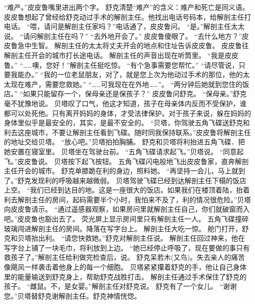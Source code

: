 \documentclass[a4paper,12pt,UTF8,twoside]{ctexbook}
\begin{document}
        “难产。”皮皮鲁嘴里进出两个字。 
        舒克清楚“难产”的含义：难产和死亡是同义语。 
        皮皮鲁想起了曾经给舒克动过手术的解剖主任。他找出电话号码本，给解剖主任打电话。 
        “喂，请问是解剖主任家吗？”电话通了，皮皮鲁问。 
        “是。”解剖主任太太说。 
        “请问解剖主任在吗？” 
        “去外地开会了。” 
        皮皮鲁傻眼了。 
        “去什么地方？”皮皮鲁急中生智。 
        解剖主任的太太将丈夫开会的地点和住址告诉皮皮鲁。 
        皮皮鲁往解剖主任开会的城市打长途电话。 
        解剖主任的声音出现在听筒里。 
        “我是皮皮鲁。” 
        “……噢，您好！”解剖主任挺吃惊。 
        “有个急事需要您帮忙。” 
        “请尽管说，只要我能办。” 
        “我的一位老鼠朋友，对了，就是您上次为他动过手术的那位，他的太太现在难产，需要您救她。” 
        “……可我现在在外地……”。 
        “两分钟后她就到您住的饭店。” 
        “如果只能留存一个，保母亲还是保孩子？” 
        皮皮鲁问舒克。 
        “保母亲。”舒克毫不犹豫地说。 
        贝塔叹了口气，他这才知道，孩子在母亲体内反而不受保护，谁都可以处死他。只有离开妈妈的身体，才受法律保护。对于孩子来说，躲在妈妈的身体里似乎是最安全的，其实，是最不安全的。 
        “贝塔，你驾驶五角飞碟送舒克和利去这座城市，不要让解剖主任看到飞碟。随时同我保持联系。”皮皮鲁将解剖主任的地址交给贝塔。 
        “放心吧。”贝塔拍拍胸脯。 
        舒克和贝塔将利抬进五角飞碟．把她安置在寝室里。 
        贝塔坐在驾驶台前。 
        “五角飞碟请求起飞。”贝塔说。 
        “同意起飞。”皮皮鲁说。 
        贝塔按下起飞按钮。 
        五角飞碟闪电般地飞出皮皮鲁家，直奔解剖主任开会的城市。 
        舒克单膝跪在利的身边，照料她。 
        “再坚持一会儿，马上就到了。”舒克发现利的呼吸越来越微弱。 
        贝塔驾驶飞碟已经到达解剖主任下榻的饭店上空。 
        “我们已经到达目的地。这是一座很大的饭店。如果我们在楼顶着陆，抬着利去解剖主任的房间，起码需要半个小时，我怕来不及了，利的情况很危险。”贝塔向皮皮鲁请示。 
        “通过遥感器观察，如果房问里就解剖主任自己，你们就破窗而入吧。”皮皮鲁也豁出去了。 
        荧光屏上显示房间里只有解剖主任一人。 
        五角飞碟撞碎玻璃闯进解剖主任的房间。降落在写字台上。 
        解剖主任大吃一惊。 
        舱门打开，舒克和贝塔抬出利。 
        “请您快救她。”舒克对解剖主任说。 
        解剖主任回过神来，他在写字台上铺了一块毛巾，将利放到上边。 
        “她已经停止呼吸了，现在要做的事只有救孩子了。”解剖主任给利做完检查后，说。 
        舒克呆若木(又鸟)。失去亲人的痛苦像飓风一样袭击着他身上的每一个细胞。 
        贝塔紧紧攥着舒克的手，他让自己身体里的能量输送到舒克身上，帮助舒克战胜打击。 
        解剖主任通过手术保住了舒克的孩子。 
        “雌鼠。不，是女婴。”解剖主任对舒克说。 
        舒克有了一个女儿。 
        “谢谢您。”贝塔替舒克谢解剖主任。舒克神情恍惚。 
\end{document}
